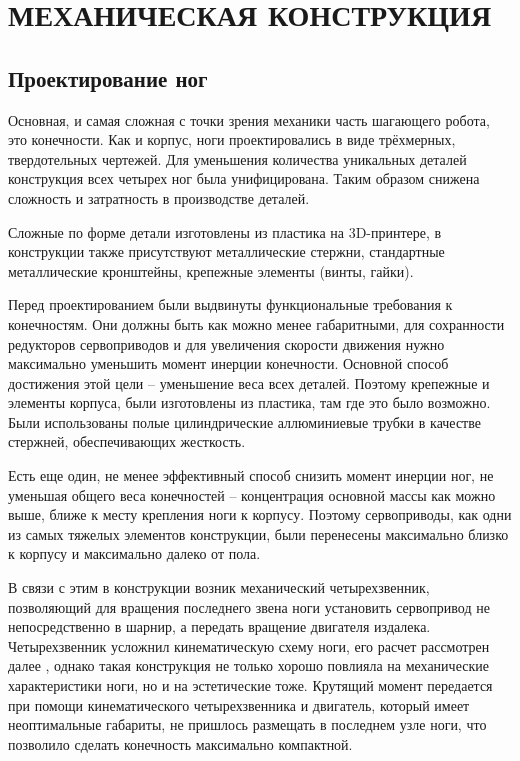 \chapter{\MakeUppercase{Механическая конструкция}}
\section{Проектирование ног}
Основная, и самая сложная с точки зрения механики часть шагающего робота, это конечности. Как и корпус, ноги проектировались в виде трёхмерных, твердотельных чертежей. Для уменьшения количества уникальных деталей конструкция всех четырех ног была унифицирована. Таким образом снижена сложность и затратность в производстве деталей. 

Сложные по форме детали изготовлены из пластика на 3D-принтере, в конструкции также присутствуют металлические стержни, стандартные металлические кронштейны, крепежные элементы (винты, гайки).

Перед проектированием были выдвинуты функциональные требования к конечностям. Они должны быть как можно менее габаритными, для сохранности редукторов сервоприводов и для увеличения скорости движения нужно максимально уменьшить момент инерции конечности. Основной способ достижения этой цели -- уменьшение веса всех деталей. Поэтому крепежные и элементы корпуса, были изготовлены из пластика, там где это было возможно. Были использованы полые цилиндрические аллюминиевые трубки в качестве стержней, обеспечивающих жесткость.

Есть еще один, не менее эффективный способ снизить момент инерции ног, не уменьшая общего веса конечностей -- концентрация основной массы как можно выше, ближе к месту крепления ноги к корпусу. Поэтому сервоприводы, как одни из самых тяжелых элементов конструкции, были перенесены максимально близко к корпусу и максимально далеко от пола.

В связи с этим в конструкции возник механический четырехзвенник, позволяющий для вращения последнего звена ноги установить сервопривод не непосредственно в шарнир, а передать вращение двигателя издалека. Четырехзвенник усложнил кинематическую схему ноги, его расчет рассмотрен далее \fixme, однако такая конструкция не только хорошо повлияла на механические характеристики ноги, но и на эстетические тоже. Крутящий момент передается при помощи кинематического четырехзвенника и двигатель, который имеет неоптимальные габариты, не пришлось размещать в последнем узле ноги, что позволило сделать конечность максимально компактной.

